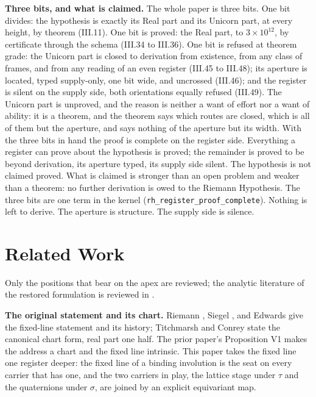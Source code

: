 \documentclass[10pt]{article}
\begin{document}
\textbf{Three bits, and what is claimed.} The whole paper is three bits.
One bit divides: the hypothesis is exactly its Real part and its Unicorn
part, at every height, by theorem (III.11). One bit is proved: the Real
part, to \(3 \times 10^{12}\), by certificate through the schema (III.34
to III.36). One bit is refused at theorem grade: the Unicorn part is
closed to derivation from existence, from any class of frames, and from
any reading of an even register (III.45 to III.48); its aperture is
located, typed supply-only, one bit wide, and uncrossed (III.46); and
the register is silent on the supply side, both orientations equally
refused (III.49). The Unicorn part is unproved, and the reason is
neither a want of effort nor a want of ability: it is a theorem, and the
theorem says which routes are closed, which is all of them but the
aperture, and says nothing of the aperture but its width. With the three
bits in hand the proof is complete on the register side. Everything a
register can prove about the hypothesis is proved; the remainder is
proved to be beyond derivation, its aperture typed, its supply side
silent. The hypothesis is not claimed proved. What is claimed is
stronger than an open problem and weaker than a theorem: no further
derivation is owed to the Riemann Hypothesis. The three bits are one
term in the kernel (\texttt{rh\_register\_proof\_complete}). Nothing is
left to derive. The aperture is structure. The supply side is silence.

\hypertarget{related-work}{%
\section{Related Work}\label{related-work}}

Only the positions that bear on the apex are reviewed; the analytic
literature of the restored formulation is reviewed in \cite{islamspine}.

\textbf{The original statement and its chart.} Riemann
\cite{riemann1859}, Siegel \cite{siegel1932}, and Edwards
\cite{edwards1974} give the fixed-line statement and its history;
Titchmarsh \cite{titchmarsh1986} and Conrey \cite{conrey2003} state the
canonical chart form, real part one half. The prior paper's Proposition
V1 makes the address a chart and the fixed line intrinsic. This paper
takes the fixed line one register deeper: the fixed line of a binding
involution is the seat on every carrier that has one, and the two
carriers in play, the lattice stage under \(\tau\) and the quaternions
under \(\sigma\), are joined by an explicit equivariant map.
\end{document}
